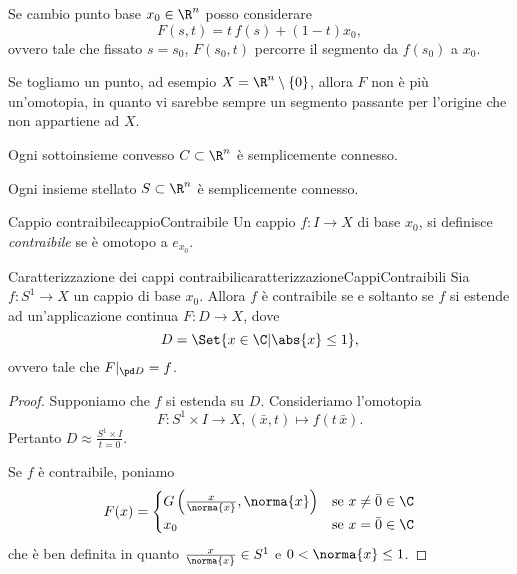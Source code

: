 \begin{oss}
	Se cambio punto base \(x_0\in \R^n\) posso considerare
	\[
		F(s,t) = t\,f(s) + (1-t)x_0,
	\]
	ovvero tale che fissato \(s=s_0\), \(F(s_0,t)\) percorre il segmento da \(f(s_0)\) a \(x_0\).
\end{oss}

\begin{oss}
	Se togliamo un punto, ad esempio \(X=\R^n \setminus \{0\}\), allora \(F\) non è più un'omotopia, in quanto vi sarebbe sempre un segmento passante per l'origine che non appartiene ad \(X\).
\end{oss}

\begin{pr}
	Ogni sottoinsieme convesso \(C\subset \R^n\) è semplicemente connesso.
\end{pr}

\begin{pr}
	Ogni insieme stellato \(S\subset \R^n\) è semplicemente connesso.
\end{pr}

\begin{defn}{Cappio contraibile}{cappioContraibile}
	Un cappio \(f\colon I \to X\) di base \(x_0\), si definisce \emph{contraibile} se è omotopo a \(e_{x_0}\).
\end{defn}

\begin{prop}{Caratterizzazione dei cappi contraibili}{caratterizzazioneCappiContraibili}
	Sia \(f\colon S^1 \to X\) un cappio di base \(x_0\).
	Allora \(f\) è contraibile se e soltanto se \(f\) si estende ad un'applicazione continua \(F\colon D \to X\), dove
	\[
		D = \Set{x\in \C | \abs{x} \le 1},
	\]
	ovvero tale che \(F|_{\pd D} = f\).
\end{prop}

\begin{proof}
	\graffito{\(\Leftarrow)\)}Supponiamo che \(f\) si estenda su \(D\).
	Consideriamo l'omotopia
	\[
		F\colon S^1 \times I \to X, (\bar{x}, t) \mapsto f(t\,\bar{x}).
	\]
	Pertanto \(D\approx \frac{S^1 \times I}{t=0}\).

	\graffito{\(\Rightarrow)\)}Se \(f\) è contraibile, poniamo
	\[
		F(x) =  \begin{cases}
			G \left( \frac{x}{\norma{x}},\norma{x} \right) & \text{se }x\neq\bar{0}\in\C \\
			x_0                                            & \text{se }x = \bar{0}\in\C
		\end{cases}
	\]
	che è ben definita in quanto \(\frac{x}{\norma{x}}\in S^1\) e \(0<\norma{x}\le 1\).
\end{proof}

